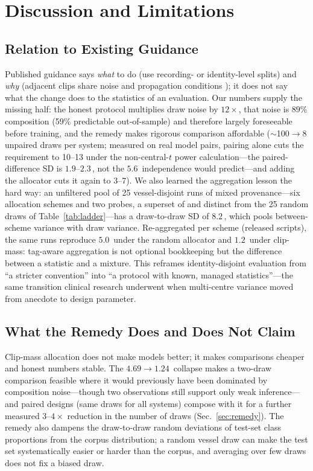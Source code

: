 ﻿\documentclass[journal]{IEEEtran}
\newcommand{\pp}{\,\text{pp}}
\begin{document}
\section{Discussion and Limitations}
\subsection{Relation to Existing Guidance}
Published guidance says \emph{what} to do (use recording- or identity-level
splits) and \emph{why} (adjacent clips share noise and propagation conditions \cite{review2026});
it does not say what the change does to the statistics of an evaluation. Our numbers supply the
missing half: the honest protocol multiplies draw noise by $12\times$, that noise is $89\%$
composition (59\% predictable out-of-sample) and therefore largely foreseeable before training,
and the remedy makes rigorous comparison
affordable ($\sim$100$\to$8 unpaired draws per system; measured on real model pairs, pairing alone
cuts the requirement to 10--13 under the non-central-$t$ power calculation---the paired-difference
SD is $1.9$--$2.3$\pp, not the $5.6$\pp{} independence would predict---and adding the allocator
cuts it again to 3--7). We also learned the aggregation lesson the hard way: an unfiltered
pool of 25 vessel-disjoint runs of mixed provenance---six allocation schemes and two probes, a
superset of and distinct from the 25 random draws of Table~\ref{tab:ladder}---has a
draw-to-draw SD of $8.2$\pp, which pools between-scheme variance with draw variance. Re-aggregated
per scheme (released scripts), the same runs reproduce $5.0$\pp{} under the random allocator and
$1.2$\pp{} under clip-mass: tag-aware aggregation is not optional bookkeeping but the difference
between a statistic and a mixture. This reframes identity-disjoint evaluation from ``a stricter
convention'' into ``a protocol with known, managed statistics''---the same transition clinical
research underwent when multi-centre variance moved from anecdote to design parameter.

\subsection{What the Remedy Does and Does Not Claim}
Clip-mass allocation does not make models better;
it makes comparisons cheaper and honest numbers stable. The $4.69\to1.24$\pp{} collapse makes a
two-draw comparison feasible where it would previously have been dominated by composition
noise---though two observations still support only weak inference---and
paired designs (same draws for all systems) compose with it for a further
measured $3$--$4\times$ reduction in the number of draws (Sec.~\ref{sec:remedy}). The remedy also
dampens the draw-to-draw random deviations of test-set class proportions from the corpus
distribution; a random vessel draw can make the test set systematically easier or
harder than the corpus, and averaging over few draws does not fix a biased draw.
\end{document}
